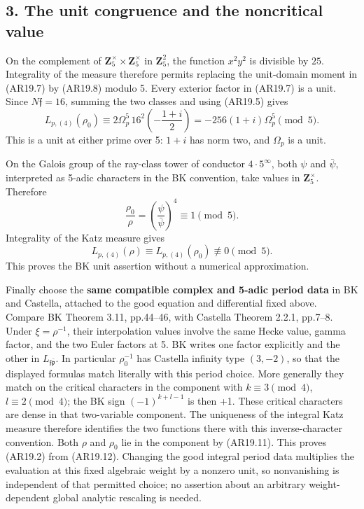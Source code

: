 \subsection{3. The unit congruence and the noncritical
value}\label{the-unit-congruence-and-the-noncritical-value}

On the complement of \(\mathbf Z_5^\times\times\mathbf Z_5^\times\) in
\(\mathbf Z_5^2\), the function \(x^2y^2\) is divisible by \(25\).
Integrality of the measure therefore permits replacing the unit-domain
moment in (AR19.7) by (AR19.8) modulo 5. Every exterior factor in
(AR19.7) is a unit. Since \(N\mathfrak f=16\), summing the two classes
and using (AR19.5) gives \[
L_{p,(4)}(\rho_0)
 \equiv2\Omega_p^5\,16^2
          \left(-\frac{1+i}{2}\right)
 =-256(1+i)\Omega_p^5\pmod5.
\tag{AR19.10}
\] This is a unit at either prime over 5: \(1+i\) has norm two, and
\(\Omega_p\) is a unit.

On the Galois group of the ray-class tower of conductor
\(4\cdot5^\infty\), both \(\psi\) and \(\bar\psi\), interpreted as
5-adic characters in the BK convention, take values in
\(\mathbf Z_5^\times\). Therefore \[
\frac{\rho_0}{\rho}
 =\left(\frac{\psi}{\bar\psi}\right)^4
 \equiv1\pmod5.
\tag{AR19.11}
\] Integrality of the Katz measure gives \[
L_{p,(4)}(\rho)\equiv L_{p,(4)}(\rho_0)\not\equiv0\pmod5.
\tag{AR19.12}
\] This proves the BK unit assertion without a numerical approximation.

Finally choose the \textbf{same compatible complex and 5-adic period
data} in BK and Castella, attached to the good equation and differential
fixed above. Compare BK Theorem 3.11, pp.44--46, with Castella Theorem
2.2.1, pp.7--8. Under \(\xi=\rho^{-1}\), their interpolation values
involve the same Hecke value, gamma factor, and the two Euler factors at
5. BK writes one factor explicitly and the other in
\(L_{\mathfrak f\bar{\mathfrak p}}\). In particular \(\rho_0^{-1}\) has
Castella infinity type \((3,-2)\), so that the displayed formulas match
literally with this period choice. More generally they match on the
critical characters in the component with \(k\equiv3\pmod4\),
\(l\equiv2\pmod4\); the BK sign \((-1)^{k+l-1}\) is then +1. These
critical characters are dense in that two-variable component. The
uniqueness of the integral Katz measure therefore identifies the two
functions there with this inverse-character convention. Both \(\rho\)
and \(\rho_0\) lie in the component by (AR19.11). This proves (AR19.2)
from (AR19.12). Changing the good integral period data multiplies the
evaluation at this fixed algebraic weight by a nonzero unit, so
nonvanishing is independent of that permitted choice; no assertion about
an arbitrary weight-dependent global analytic rescaling is needed.

